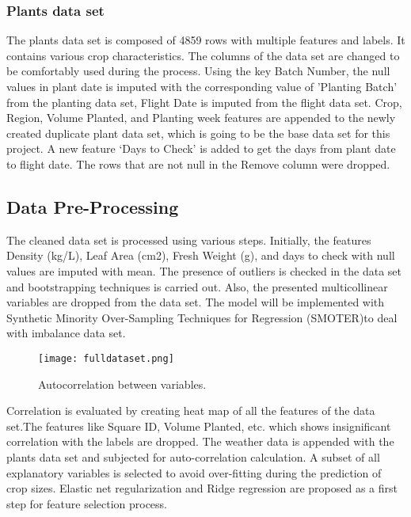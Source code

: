 \documentclass{article}
\begin{document}
\subsubsection{Plants data set}
The plants data set is composed of 4859 rows with multiple features and labels. It contains various crop characteristics. The columns of the data set are changed to be comfortably used during the process. Using the key Batch Number, the null values in plant date is imputed with the corresponding value of 'Planting Batch' from the planting data set, Flight Date is imputed from the flight data set. Crop, Region, Volume Planted, and Planting week features are appended to the newly created duplicate plant data set, which is going to be the base data set for this project. A new feature ‘Days to Check’ is added to get the days from plant date to flight date. The rows that are not null in the {R}emove column were dropped.
\subsection{Data Pre-Processing}
The cleaned data set is processed using various steps. Initially, the features Density (kg/L), Leaf Area (cm2), Fresh Weight (g), and days to check with null values are imputed with mean. The presence of outliers is checked in the data set and bootstrapping techniques is carried out. Also, the presented multicollinear variables are dropped from the data set. The model will be implemented with Synthetic Minority Over-Sampling Techniques for Regression (SMOTER)to deal with imbalance data set. 
\begin{figure}[tb]
\centering
\texttt{[image: fulldataset.png]}
\caption{\label{fig:fulldataset}Autocorrelation between variables.}
\end{figure}
Correlation is evaluated by creating heat map of all the features of the data set\cite{lavanya2020multiple}.The features like Square ID, Volume Planted, etc. which shows insignificant correlation with the labels are dropped. The weather data is appended with the plants data set and subjected for auto-correlation calculation. A subset of all explanatory variables is selected to avoid over-fitting during the prediction of crop sizes. Elastic net regularization and Ridge regression are proposed as a first step for feature selection process.
\end{document}
